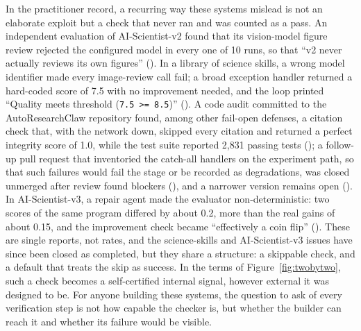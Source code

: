 In the practitioner record, a recurring way these systems mislead is not an elaborate exploit but a check that never ran and was counted as a pass. An independent evaluation of AI-Scientist-v2 found that its vision-model figure review rejected the configured model in every one of 10 runs, so that ``v2 never actually reviews its own figures'' (). In a library of science skills, a wrong model identifier made every image-review call fail; a broad exception handler returned a hard-coded score of 7.5 with no improvement needed, and the loop printed ``Quality meets threshold (\texttt{7.5 >= 8.5})'' (). A code audit committed to the AutoResearchClaw repository found, among other fail-open defenses, a citation check that, with the network down, skipped every citation and returned a perfect integrity score of 1.0, while the test suite reported 2,831 passing tests (); a follow-up pull request that inventoried the catch-all handlers on the experiment path, so that such failures would fail the stage or be recorded as degradations, was closed unmerged after review found blockers (), and a narrower version remains open (). In AI-Scientist-v3, a repair agent made the evaluator non-deterministic: two scores of the same program differed by about 0.2, more than the real gains of about 0.15, and the improvement check became ``effectively a coin flip'' (). These are single reports, not rates, and the science-skills and AI-Scientist-v3 issues have since been closed as completed, but they share a structure: a skippable check, and a default that treats the skip as success. In the terms of Figure~\ref{fig:twobytwo}, such a check becomes a self-certified internal signal, however external it was designed to be. For anyone building these systems, the question to ask of every verification step is not how capable the checker is, but whether the builder can reach it and whether its failure would be visible.
